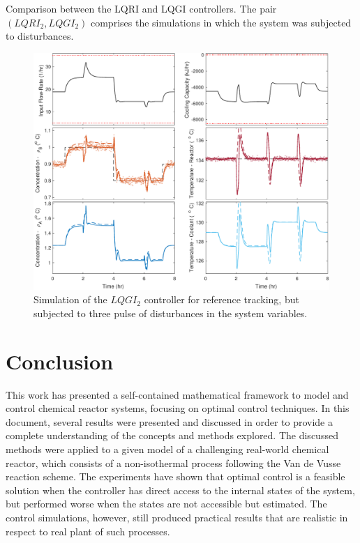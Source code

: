 \documentclass[a4paper,11pt]{book}
\numberwithin{figure}{chapter}
\numberwithin{equation}{chapter}
\numberwithin{table}{chapter}
\theoremstyle{definition}
\begin{document}
\begin{table}[ht]
	\caption{Comparison between the LQRI and LQGI controllers. The pair $(LQRI_2, LQGI_2)$ comprises the simulations in which the system was subjected to disturbances.}
	\label{tb:lqriMetrics}
\end{table}

\begin{figure}[ht] \centering
	\includegraphics[width=\textwidth]{chapter7/lqgi02}
	\caption{Simulation of the $LQGI_2$ controller for reference tracking, but subjected to three pulse of disturbances in the system variables.}
	\label{fig:lqgi02}
\end{figure}	

\clearpage
\chapter{Conclusion}

This work has presented a self-contained mathematical framework to model and control chemical reactor systems, focusing on optimal control techniques. In this document, several results were presented and discussed in order to provide a complete understanding of the concepts and methods explored. The discussed methods were applied to a given model of a challenging real-world chemical reactor, which consists of a non-isothermal process following the Van de Vusse reaction scheme. The experiments have shown that optimal control is a feasible solution when the controller has direct access to the internal states of the system, but performed worse when the states are not accessible but estimated. The control simulations, however, still produced practical results that are realistic in respect to real plant of such processes.
\end{document}
